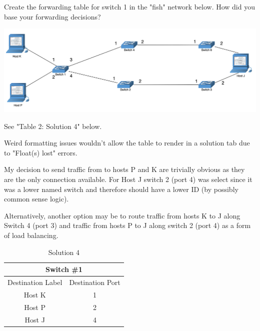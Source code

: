 \documentclass[12pt,addpoints,answers]{exam}
\begin{document}
\begin{questions}
\question[6] Create the forwarding table for switch 1 in the "fish" network below. How did you base your forwarding decisions?
\begin{center}
\includegraphics[width=1.0\linewidth]{fig/fish.png}
\end{center}
\begin{solution}
	See "Table 2: Solution 4" below.
	
	Weird formatting issues wouldn't allow the table to render in a solution tab due to "Float(s) lost" errors.
	
	My decision to send traffic from to hosts P and K are trivially obvious as they are the only connection available.  For Host J switch 2 (port 4) was select since it was a lower named switch and therefore should have a lower ID (by possibly common sense logic).
	
	Alternatively, another option may be to route traffic from hosts K to J along Switch 4 (port 3) and traffic from hosts P to J along switch 2 (port 4) as a form of load balancing.
\end{solution}
\begin{table}[]
	\centering
	\caption{Solution 4}
	\label{Table 2}
	\begin{tabular}{|c|c|}
		\hline
		\multicolumn{2}{|c|}{Switch \#1}      \\ \hline
		Destination Label & Destination Port \\ \hline
		Host K            & 1                \\
		Host P            & 2                \\
		Host J            & 4               
	\end{tabular}
\end{table}
\newpage


\end{questions}
\end{document}
